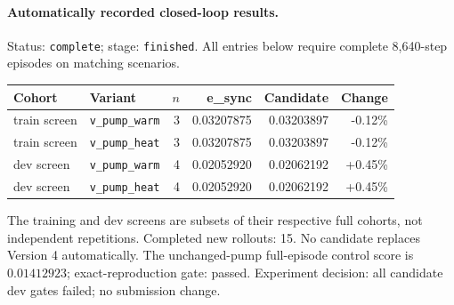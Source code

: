 \paragraph{Automatically recorded closed-loop results.}
Status: \texttt{complete}; stage: \texttt{finished}.
All entries below require complete 8,640-step episodes on matching scenarios.
\begin{center}\small
\begin{tabular}{llrrrr}\toprule
Cohort & Variant & $n$ & e\_sync & Candidate & Change \\\midrule
train screen & \texttt{v\_pump\_warm} & 3 & 0.03207875 & 0.03203897 & -0.12\% \\
train screen & \texttt{v\_pump\_heat} & 3 & 0.03207875 & 0.03203897 & -0.12\% \\
dev screen & \texttt{v\_pump\_warm} & 4 & 0.02052920 & 0.02062192 & +0.45\% \\
dev screen & \texttt{v\_pump\_heat} & 4 & 0.02052920 & 0.02062192 & +0.45\% \\
\bottomrule\end{tabular}\end{center}
The training and dev screens are subsets of their respective full cohorts, not independent repetitions.
Completed new rollouts: 15. No candidate replaces Version 4 automatically.
The unchanged-pump full-episode control score is $0.01412923$; exact-reproduction gate: passed.
Experiment decision: all candidate dev gates failed; no submission change.
